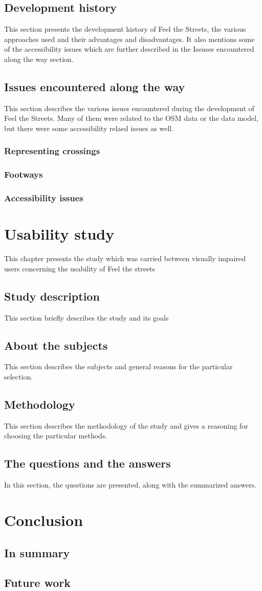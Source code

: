 \documentclass[nolof,digital]{fithesis3}
\begin{document}
\section{Development history}
This section presents the development history of Feel the Streets, the various approaches used and their advantages and disadvantages. It also mentions some of the accessibility issues which are further described in the Issuses encountered along the way section.
\section{Issues encountered along the way}
This section describes the various issues encountered during the development of Feel the Streets. Many of them were related to the OSM data or the data model, but there were some accessibility relaed issues as well.
\subsection{Representing crossings}
\subsection{Footways}
\subsection{Accessibility issues}
\chapter{Usability study}
This chapter presents the study which was carried between visually impaired users concerning the usability of Feel the streets
\section{Study description}
This section briefly describes the study and its goals
\section{About the subjects}
This section describes the subjects and general reasons for the particular selection.
\section{Methodology}
This section describes the methodology of the study and gives a reasoning for choosing the particular methods.
\section{The questions and the answers}
In this section, the questions are presented, along with the summarized answers.
\chapter{Conclusion}
\section{In summary}
\section{Future work}
\end{document}
